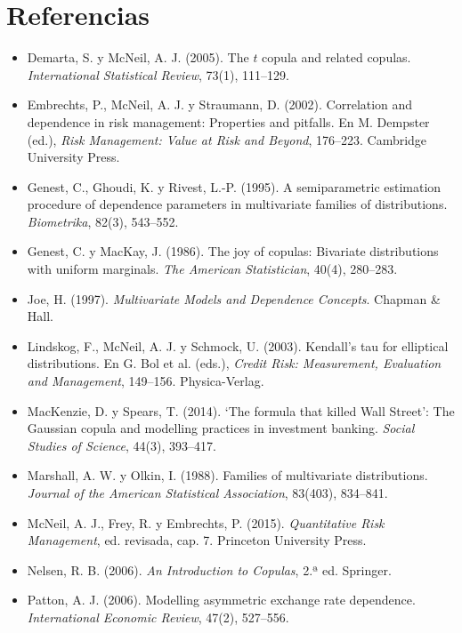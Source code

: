 \section*{Referencias}
\begin{itemize}[leftmargin=*]
  \item Demarta, S. y McNeil, A. J. (2005). The $t$ copula and related copulas. \emph{International Statistical Review}, 73(1),
        111--129.
  \item Embrechts, P., McNeil, A. J. y Straumann, D. (2002). Correlation and dependence in risk management: Properties and
        pitfalls. En M. Dempster (ed.), \emph{Risk Management: Value at Risk and Beyond}, 176--223. Cambridge University Press.
  \item Genest, C., Ghoudi, K. y Rivest, L.-P. (1995). A semiparametric estimation procedure of dependence parameters in
        multivariate families of distributions. \emph{Biometrika}, 82(3), 543--552.
  \item Genest, C. y MacKay, J. (1986). The joy of copulas: Bivariate distributions with uniform marginals. \emph{The American
        Statistician}, 40(4), 280--283.
  \item Joe, H. (1997). \emph{Multivariate Models and Dependence Concepts}. Chapman \& Hall.
  \item Lindskog, F., McNeil, A. J. y Schmock, U. (2003). Kendall's tau for elliptical distributions. En G. Bol et al. (eds.),
        \emph{Credit Risk: Measurement, Evaluation and Management}, 149--156. Physica-Verlag.
  \item MacKenzie, D. y Spears, T. (2014). `The formula that killed Wall Street': The Gaussian copula and modelling practices
        in investment banking. \emph{Social Studies of Science}, 44(3), 393--417.
  \item Marshall, A. W. y Olkin, I. (1988). Families of multivariate distributions. \emph{Journal of the American Statistical
        Association}, 83(403), 834--841.
  \item McNeil, A. J., Frey, R. y Embrechts, P. (2015). \emph{Quantitative Risk Management}, ed. revisada, cap. 7. Princeton
        University Press.
  \item Nelsen, R. B. (2006). \emph{An Introduction to Copulas}, 2.ª ed. Springer.
  \item Patton, A. J. (2006). Modelling asymmetric exchange rate dependence. \emph{International Economic Review}, 47(2),
        527--556.
\end{itemize}
